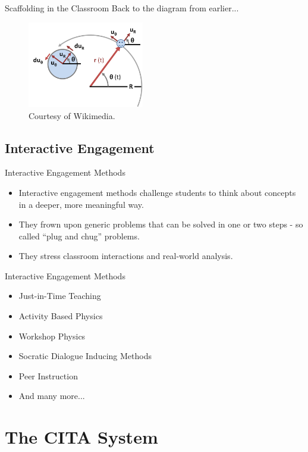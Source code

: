 \documentclass{beamer}
\begin{document}
\begin{frame}{Scaffolding in the Classroom}
Back to the diagram from earlier...
\vspace{5mm}
  \begin{figure}
  \centering
    \includegraphics[width=2in]{img/presentation/vectors}
    \caption{Courtesy of Wikimedia.}
  \end{figure}
\end{frame}

\subsection*{Interactive Engagement}

\begin{frame}{Interactive Engagement Methods}
\begin{itemize}
\item Interactive engagement methods challenge students to think about concepts in a deeper, more meaningful way.
\item They frown upon generic problems that can be solved in one or two steps - so called ``plug and chug'' problems. 
\item They stress classroom interactions and real-world analysis.
\end{itemize}
\end{frame}

\begin{frame}{Interactive Engagement Methods}
\begin{itemize}
\item Just-in-Time Teaching
\item Activity Based Physics
\item Workshop Physics
\item Socratic Dialogue Inducing Methods
\item Peer Instruction
\item And many more...
\end{itemize}
\end{frame}

\section{The CITA System}
\end{document}
